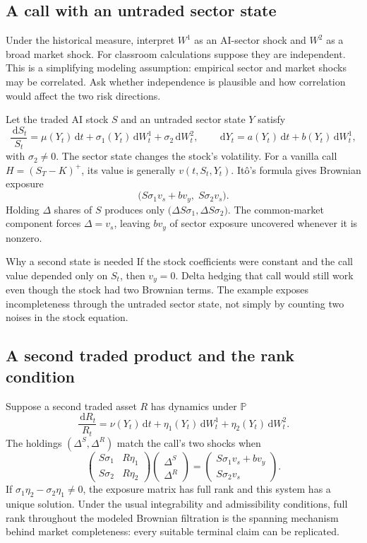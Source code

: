 \documentclass[10pt]{article}
\newcommand{\Pp}{\mathbb P}
\newcommand{\1}{\mathbf 1}
\newcommand{\dd}{\,\mathrm d}
\theoremstyle{definition}
\begin{document}
\subsection{A call with an untraded sector state}

Under the historical measure, interpret \(W^1\) as an AI-sector shock and
\(W^2\) as a broad market shock. For classroom calculations suppose they
are independent. This is a simplifying modeling assumption: empirical
sector and market shocks may be correlated. Ask whether independence is
plausible and how correlation would affect the two risk directions.

Let the traded AI stock \(S\) and an untraded sector state \(Y\) satisfy
\[
\frac{\dd S_t}{S_t}
=\mu(Y_t)\dd t+\sigma_1(Y_t)\dd W_t^1+\sigma_2\dd W_t^2,
\qquad
\dd Y_t=a(Y_t)\dd t+b(Y_t)\dd W_t^1,
\]
with \(\sigma_2\neq0\). The sector state changes the stock's volatility.
For a vanilla call \(H=(S_T-K)^+\), its value is generally
\(v(t,S_t,Y_t)\). It\^o's formula gives Brownian exposure
\[
\bigl(S\sigma_1v_s+bv_y,\;S\sigma_2v_s\bigr).
\]
Holding \(\Delta\) shares of \(S\) produces only
\(\bigl(\Delta S\sigma_1,\Delta S\sigma_2\bigr)\).
The common-market component forces \(\Delta=v_s\), leaving
\(bv_y\) of sector exposure uncovered whenever it is nonzero.

\begin{warningbox}{Why a second state is needed}
If the stock coefficients were constant and the call value depended only
on \(S_t\), then \(v_y=0\). Delta hedging that call would still work even
though the stock had two Brownian terms. The example exposes
incompleteness through the untraded sector state, not simply by counting
two noises in the stock equation.
\end{warningbox}

\subsection{A second traded product and the rank condition}

Suppose a second traded asset \(R\) has dynamics under \(\Pp\)
\[
\frac{\dd R_t}{R_t}
=\nu(Y_t)\dd t+\eta_1(Y_t)\dd W_t^1+\eta_2(Y_t)\dd W_t^2.
\]
The holdings \((\Delta^S,\Delta^R)\) match the call's two shocks when
\[
\begin{pmatrix}S\sigma_1&R\eta_1\\S\sigma_2&R\eta_2\end{pmatrix}
\begin{pmatrix}\Delta^S\\\Delta^R\end{pmatrix}
=\begin{pmatrix}S\sigma_1v_s+bv_y\\S\sigma_2v_s\end{pmatrix}.
\]
If \(\sigma_1\eta_2-\sigma_2\eta_1\neq0\), the exposure matrix has full
rank and this system has a unique solution. Under the usual
integrability and admissibility conditions, full rank throughout the
modeled Brownian filtration is the spanning mechanism behind market
completeness: every suitable terminal claim can be replicated.
\end{document}
